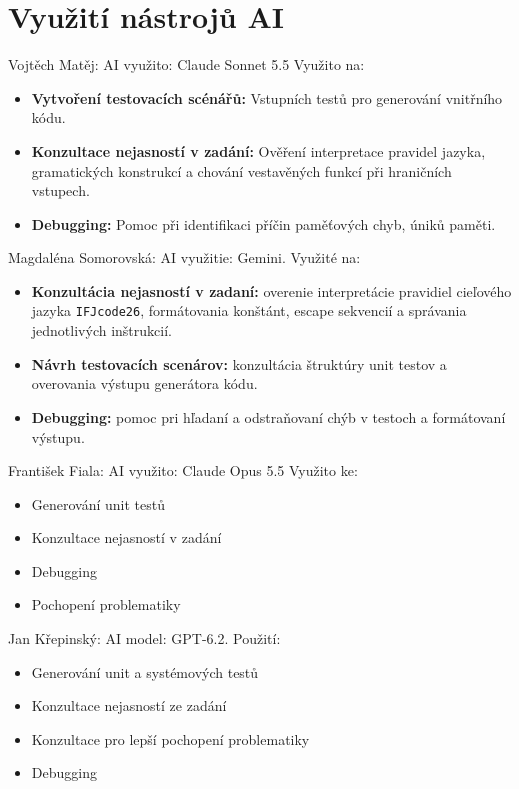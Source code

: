 \section{Využití nástrojů AI}

Vojtěch Matěj:
AI využito: Claude Sonnet 5.5
Využito na:
\begin{itemize}
    \item\textbf{Vytvoření testovacích scénářů:} Vstupních testů pro generování vnitřního kódu.
    \item\textbf{Konzultace nejasností v zadání:} Ověření interpretace pravidel jazyka, gramatických konstrukcí a chování vestavěných funkcí při hraničních vstupech.
\item \textbf{Debugging:} Pomoc při identifikaci příčin paměťových chyb, úniků paměti.
\end{itemize}

\noindent Magdaléna Somorovská: AI využitie: Gemini. Využité na:
\begin{itemize}
    \item \textbf{Konzultácia nejasností v zadaní:} overenie interpretácie pravidiel cieľového jazyka \texttt{IFJcode26}, formátovania konštánt, escape sekvencií a správania jednotlivých inštrukcií.
    \item \textbf{Návrh testovacích scenárov:} konzultácia štruktúry unit testov a overovania výstupu generátora kódu.
    \item \textbf{Debugging:} pomoc pri hľadaní a odstraňovaní chýb v testoch a formátovaní výstupu.
\end{itemize}

\noindent František Fiala:
AI využito: Claude Opus 5.5
Využito ke:
\begin{itemize}
    \item Generování unit testů
    \item Konzultace nejasností v zadání 
    \item Debugging
    \item Pochopení problematiky
\end{itemize}
\noindent Jan Křepinský:
AI model: GPT-6.2.
Použití:
\begin{itemize}
    \item Generování unit a systémových testů
    \item Konzultace nejasností ze zadání
    \item Konzultace pro lepší pochopení problematiky
    \item Debugging
\end{itemize}